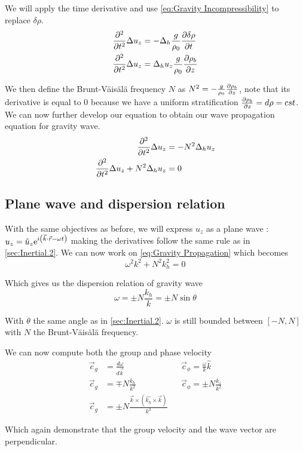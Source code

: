 We will apply the time derivative and use \cref{eq:Gravity Incompressibility} to replace $\delta \rho$.
\begin{align*}
	\frac{\partial^2 }{\partial t^2} \Delta u_z & = - \Delta_h \frac{g}{\rho_0}\frac{\partial \delta \rho}{\partial t} \\
	\frac{\partial^2 }{\partial t^2} \Delta u_z & = \Delta_h u_z \frac{g}{\rho_0} \frac{\partial \rho_b}{\partial z}
\end{align*}

We then define the Brunt-Väisälä frequency \cite{pedlosky_geophysical_1979} $N$ as $N^2 = - \frac{g}{\rho_0} \frac{\partial \rho_b}{\partial z}$, note that its derivative is equal to 0 because we have a uniform stratification $\frac{\partial \rho_b}{\partial z} = d\rho = cst$. We can now further develop our equation to obtain our wave propagation equation for gravity wave.
\begin{align}
	\frac{\partial^2 }{\partial t^2} \Delta u_z & = - N^2 \Delta_h u_z \nonumber \\
	\frac{\partial^2 }{\partial t^2} \Delta u_z + N^2 \Delta_h u_z & = 0 \label{eq:Gravity Propagation}
\end{align}

\subsection{Plane wave and dispersion relation}
With the same objectives as before, we will express $u_z$ as a plane wave : $u_z = \hat{u}_z \mathrm{e}^{i\left( \vec{k} \cdot \vec{r} - \omega t \right)}$ making the derivatives follow the same rule as in \cref{sec:Inertial.2}. We can now work on \cref{eq:Gravity Propagation} which becomes
\begin{equation*}
	\omega^2 k^2 + N^2 k_h^2 = 0
\end{equation*}

Which gives us the dispersion relation of gravity wave 
\begin{equation}
	\omega = \pm N \frac{k_h}{k} = \pm N \sin{\theta}
\end{equation}

With $\theta$ the same angle as in \cref{sec:Inertial.2}. $\omega$ is still bounded between $\left[ -N , N \right]$ with $N$ the Brunt-Väisälä frequency. 

We can now compute both the group and phase velocity
\begin{align*}
	\vec{c}_g & = \frac{d \omega}{d\vec{k}} && \vec{c}_\phi = \frac{\omega}{k} \hat{k} \\
    \vec{c}_g & = \mp N \frac{k_h}{k^2} && \vec{c}_\phi = \pm N \frac{k_z}{k^2} \\
    \vec{c}_g & = \pm N \frac{\vec{k} \times \left( \hat{k_h} \times \vec{k} \right)}{k^3}
\end{align*}

Which again demonstrate that the group velocity and the wave vector are perpendicular.